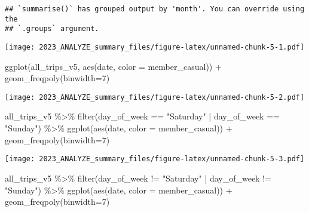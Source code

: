 \documentclass[
]{article}
\newenvironment{Shaded}{\begin{snugshade}}{\end{snugshade}}
\newcommand{\AttributeTok}[1]{\textcolor[rgb]{0.77,0.63,0.00}{#1}}
\newcommand{\DecValTok}[1]{\textcolor[rgb]{0.00,0.00,0.81}{#1}}
\newcommand{\FunctionTok}[1]{\textcolor[rgb]{0.00,0.00,0.00}{#1}}
\newcommand{\NormalTok}[1]{#1}
\newcommand{\SpecialCharTok}[1]{\textcolor[rgb]{0.00,0.00,0.00}{#1}}
\newcommand{\StringTok}[1]{\textcolor[rgb]{0.31,0.60,0.02}{#1}}
\begin{document}
\begin{verbatim}
## `summarise()` has grouped output by 'month'. You can override using the
## `.groups` argument.
\end{verbatim}

\texttt{[image: 2023\_ANALYZE\_summary\_files/figure-latex/unnamed-chunk-5-1.pdf]}

\begin{Shaded}
\begin{Highlighting}[]
\FunctionTok{ggplot}\NormalTok{(all\_trips\_v5, }\FunctionTok{aes}\NormalTok{(date, }\AttributeTok{color =}\NormalTok{ member\_casual)) }\SpecialCharTok{+} 
  \FunctionTok{geom\_freqpoly}\NormalTok{(}\AttributeTok{binwidth=}\DecValTok{7}\NormalTok{)}
\end{Highlighting}
\end{Shaded}

\texttt{[image: 2023\_ANALYZE\_summary\_files/figure-latex/unnamed-chunk-5-2.pdf]}

\begin{Shaded}
\begin{Highlighting}[]
\NormalTok{all\_trips\_v5 }\SpecialCharTok{\%\textgreater{}\%} 
  \FunctionTok{filter}\NormalTok{(day\_of\_week }\SpecialCharTok{==} \StringTok{"Saturday"} \SpecialCharTok{|}\NormalTok{ day\_of\_week }\SpecialCharTok{==} \StringTok{"Sunday"}\NormalTok{) }\SpecialCharTok{\%\textgreater{}\%}
\FunctionTok{ggplot}\NormalTok{(}\FunctionTok{aes}\NormalTok{(date, }\AttributeTok{color =}\NormalTok{ member\_casual)) }\SpecialCharTok{+} 
  \FunctionTok{geom\_freqpoly}\NormalTok{(}\AttributeTok{binwidth=}\DecValTok{7}\NormalTok{)}
\end{Highlighting}
\end{Shaded}

\texttt{[image: 2023\_ANALYZE\_summary\_files/figure-latex/unnamed-chunk-5-3.pdf]}

\begin{Shaded}
\begin{Highlighting}[]
\NormalTok{all\_trips\_v5 }\SpecialCharTok{\%\textgreater{}\%} 
  \FunctionTok{filter}\NormalTok{(day\_of\_week }\SpecialCharTok{!=} \StringTok{"Saturday"} \SpecialCharTok{|}\NormalTok{ day\_of\_week }\SpecialCharTok{!=} \StringTok{"Sunday"}\NormalTok{) }\SpecialCharTok{\%\textgreater{}\%}
\FunctionTok{ggplot}\NormalTok{(}\FunctionTok{aes}\NormalTok{(date, }\AttributeTok{color =}\NormalTok{ member\_casual)) }\SpecialCharTok{+} 
  \FunctionTok{geom\_freqpoly}\NormalTok{(}\AttributeTok{binwidth=}\DecValTok{7}\NormalTok{)}
\end{Highlighting}
\end{Shaded}
\end{document}
